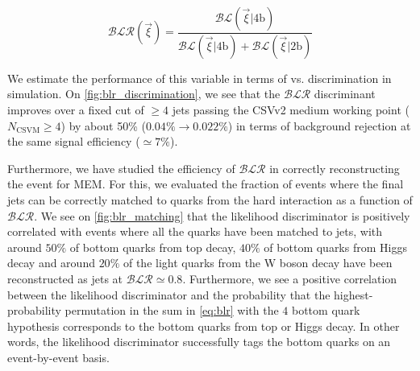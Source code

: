 \begin{equation}
\label{eq:blr_ratio}
\mathcal{BLR}(\vec{\xi}) = \frac{\mathcal{BL}(\vec{\xi} | 4\mathrm{b})}{\mathcal{BL}(\vec{\xi} | 4\mathrm{b}) + \mathcal{BL}(\vec{\xi} | 2\mathrm{b})}
\end{equation}

We estimate the performance of this variable in terms of \ttHbb vs. \ttlf discrimination in simulation. On \cref{fig:blr_discrimination}, we see that the $\mathcal{BLR}$ discriminant improves over a fixed cut of $\ge4$ jets passing the CSVv2 medium working point ($N_{\mathrm{CSVM}} \ge 4$) by about 50\% ($0.04\% \rightarrow 0.022\%$) in terms of background rejection at the same signal efficiency ($\simeq 7\%$).

Furthermore, we have studied the efficiency of $\mathcal{BLR}$ in correctly reconstructing the event for MEM. For this, we evaluated the fraction of events where the final jets can be correctly matched to quarks from the hard interaction as a function of $\mathcal{BLR}$. We see on \cref{fig:blr_matching} that the likelihood discriminator is positively correlated with events where all the quarks have been matched to jets, with around $50\%$ of bottom quarks from top decay, $40\%$ of bottom quarks from Higgs decay and around $20\%$ of the light quarks from the W boson decay have been reconstructed as jets at $\mathcal{BLR} \simeq 0.8$. Furthermore, we see a positive correlation between the likelihood discriminator and the probability that the highest-probability permutation in the sum in \cref{eq:blr} with the $4$ bottom quark hypothesis corresponds to the bottom quarks from top or Higgs decay. In other words, the likelihood discriminator successfully tags the bottom quarks on an event-by-event basis.

